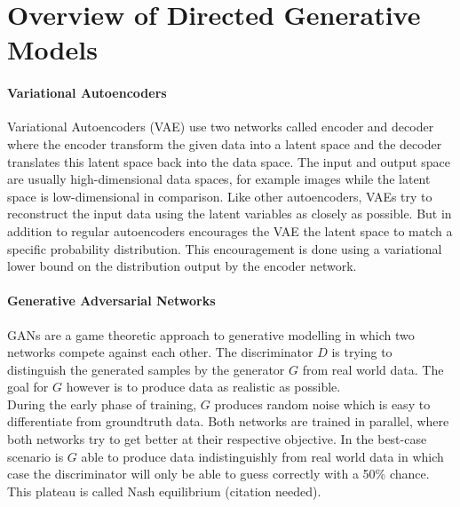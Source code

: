 \documentclass[twoside,11pt,a4paper]{article}
\theoremstyle{break}
\begin{document}
\section{Overview of Directed Generative Models}
\label{sec:overview}


\paragraph{Variational Autoencoders\cite{vae:2013}}
\label{par:overview_vae}
Variational Autoencoders (VAE) use two networks called encoder and decoder where the encoder transform the given data into a latent space and the decoder translates this latent space back into the data space.
The input and output space are usually high-dimensional data spaces, for example images while the latent space is low-dimensional in comparison.
Like other autoencoders, VAEs try to reconstruct the input data using the latent variables as closely as possible.
But in addition to regular autoencoders encourages the VAE the latent space to match a specific probability distribution.
This encouragement is done using a variational lower bound on the distribution output by the encoder network.







\paragraph{Generative Adversarial Networks}
\label{par:overview_gan}
GANs are a game theoretic approach to generative modelling
in which two networks compete against each other.
The discriminator $D$ is trying to distinguish the generated samples
by the generator $G$ from real world data.
The goal for $G$ however is to produce data as realistic as possible.\\
During the early phase of training, $G$ produces random noise which
is easy to differentiate from groundtruth data.
Both networks are trained in parallel, where both networks try to get better
at their respective objective.
In the best-case scenario is $G$ able to produce data indistinguishly from real world data in which
case the discriminator will only be able to guess correctly with a 50\% chance.
This plateau is called Nash equilibrium (citation needed).
\end{document}
